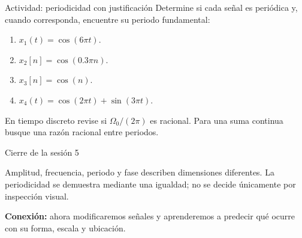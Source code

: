 \documentclass[
  ignorenonframetext,
  aspectratio=169,
  spanish,
  professionalfonts]{beamer}
\providecommand{\tightlist}{%
  \setlength{\itemsep}{0pt}\setlength{\parskip}{0pt}}
\begin{document}
\begin{frame}{Actividad: periodicidad con justificación}
\protect{}\label{actividad-periodicidad-con-justificaciuxf3n}
Determine si cada señal es periódica y, cuando corresponda, encuentre su
periodo fundamental:

\begin{enumerate}
\tightlist
\item
  \(x_1(t)=\cos(6\pi t)\).
\item
  \(x_2[n]=\cos(0.3\pi n)\).
\item
  \(x_3[n]=\cos(n)\).
\item
  \(x_4(t)=\cos(2\pi t)+\sin(3\pi t)\).
\end{enumerate}

\begin{tcolorbox}[enhanced jigsaw, arc=.35mm, bottomrule=.15mm, bottomtitle=1mm, breakable, colback=white, colbacktitle=quarto-callout-note-color!10!white, colframe=quarto-callout-note-color-frame, coltitle=black, left=2mm, leftrule=.75mm, opacityback=0, opacitybacktitle=0.6, rightrule=.15mm, title={Pista}, titlerule=0mm, toprule=.15mm, toptitle=1mm]

En tiempo discreto revise si \(\Omega_0/(2\pi)\) es racional. Para una
suma continua busque una razón racional entre periodos.

\end{tcolorbox}
\end{frame}

\begin{frame}{Cierre de la sesión 5}
\protect{}\label{cierre-de-la-sesiuxf3n-5}
\begin{tcolorbox}[enhanced jigsaw, arc=.35mm, bottomrule=.15mm, bottomtitle=1mm, breakable, colback=white, colbacktitle=quarto-callout-important-color!10!white, colframe=quarto-callout-important-color-frame, coltitle=black, left=2mm, leftrule=.75mm, opacityback=0, opacitybacktitle=0.6, rightrule=.15mm, title={Síntesis}, titlerule=0mm, toprule=.15mm, toptitle=1mm]

Amplitud, frecuencia, periodo y fase describen dimensiones diferentes.
La periodicidad se demuestra mediante una igualdad; no se decide
únicamente por inspección visual.

\end{tcolorbox}

\textbf{Conexión:} ahora modificaremos señales y aprenderemos a predecir
qué ocurre con su forma, escala y ubicación.
\end{frame}
\end{document}
